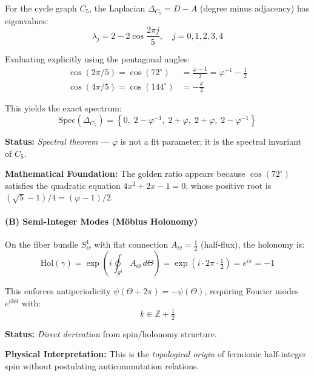 \documentclass[12pt]{article}
\begin{document}
For the cycle graph $C_5$, the Laplacian $\Delta_{C_5} = D - A$ (degree minus adjacency) has eigenvalues:
\begin{equation}
\lambda_j = 2 - 2\cos\!\frac{2\pi j}{5}, \quad j = 0, 1, 2, 3, 4
\end{equation}

Evaluating explicitly using the pentagonal angles:
\begin{align}
\cos(2\pi/5) = \cos(72^\circ) &= \frac{\varphi - 1}{2} = \varphi^{-1} - \frac{1}{2} \\
\cos(4\pi/5) = \cos(144^\circ) &= -\frac{\varphi}{2}
\end{align}

This yields the exact spectrum:
\begin{equation}
\boxed{\text{Spec}(\Delta_{C_5}) = \left\{0,\; 2 - \varphi^{-1},\; 2 + \varphi,\; 2 + \varphi,\; 2 - \varphi^{-1}\right\}}
\end{equation}

\textbf{Status:} \textit{Spectral theorem} — $\varphi$ is not a fit parameter; it is the spectral invariant of $C_5$.

\textbf{Mathematical Foundation:} The golden ratio appears because $\cos(72^\circ)$ satisfies the quadratic equation $4x^2 + 2x - 1 = 0$, whose positive root is $(\sqrt{5} - 1)/4 = (\varphi - 1)/2$.

\paragraph{(B) Semi-Integer Modes (M\"obius Holonomy)}

On the fiber bundle $S^1_\Theta$ with flat connection $A_\Theta = \tfrac{1}{2}$ (half-flux), the holonomy is:
\begin{equation}
\text{Hol}(\gamma) = \exp\!\left(i \oint_{S^1} A_\Theta \, d\Theta\right) = \exp(i \cdot 2\pi \cdot \tfrac{1}{2}) = e^{i\pi} = -1
\end{equation}

This enforces antiperiodicity $\psi(\Theta + 2\pi) = -\psi(\Theta)$, requiring Fourier modes $e^{ik\Theta}$ with:
\begin{equation}
\boxed{k \in \mathbb{Z} + \tfrac{1}{2}}
\end{equation}

\textbf{Status:} \textit{Direct derivation} from spin/holonomy structure.

\textbf{Physical Interpretation:} This is the \textit{topological origin} of fermionic half-integer spin without postulating anticommutation relations.
\end{document}
